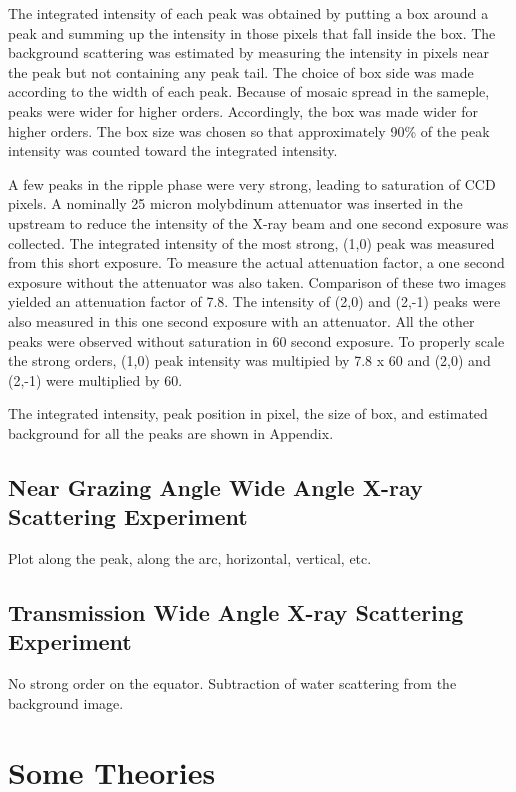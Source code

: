 The integrated intensity of each peak was obtained by putting a box around a
peak and summing up the intensity in those pixels that fall inside the box.
The background scattering was estimated by measuring the intensity in pixels
near the peak but not containing any peak tail. The choice of box side was 
made according to the width of each peak. Because of mosaic spread in the sameple,
peaks were wider for higher orders. Accordingly, the box was made wider for higher
orders. The box size was chosen so that approximately 90\% of the peak intensity
was counted toward the integrated intensity.

A few peaks in the ripple phase
were very strong, leading to saturation of CCD pixels. A nominally 25 micron 
molybdinum attenuator was inserted in the upstream to reduce the intensity
of the X-ray beam and one second exposure was collected. The integrated intensity 
of the most strong, (1,0) peak was measured from this short exposure. To
measure the actual attenuation factor, a one second exposure without the 
attenuator was also taken. Comparison of these two images yielded an 
attenuation factor of 7.8. The intensity of (2,0) and (2,-1) peaks were also
measured in this one second exposure with an attenuator. All the other peaks
were observed without saturation in 60 second exposure. To properly scale the 
strong orders, (1,0) peak intensity was multipied by 7.8 x 60 and (2,0) and
(2,-1) were multiplied by 60. 

The integrated intensity, peak position in pixel, the size of box, and estimated
background for all the peaks are shown in Appendix.

\subsection{Near Grazing Angle Wide Angle X-ray Scattering Experiment}
Plot along the peak, along the arc, horizontal, vertical, etc.

\subsection{Transmission Wide Angle X-ray Scattering Experiment}
No strong order on the equator. Subtraction of water scattering from the
background image.

\section{Some Theories}
